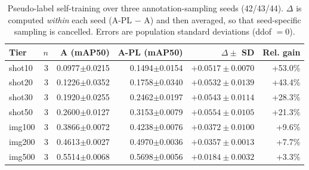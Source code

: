 \begin{table}[htbp]
\centering
\caption{Pseudo-label self-training over three annotation-sampling seeds (42/43/44). $\Delta$ is computed \emph{within} each seed (A-PL $-$ A) and then averaged, so that seed-specific sampling is cancelled. Errors are population standard deviations (ddof $=0$).}
\label{tab:pseudo-label-3seed}
\begin{tabular}{lrrrrr}
\toprule
Tier & $n$ & A (mAP50) & A-PL (mAP50) & $\Delta \pm$ SD & Rel. gain \\
\midrule
shot10 & 3 & 0.0977$\pm$0.0215 & 0.1494$\pm$0.0154 & $+0.0517\pm0.0070$ & +53.0\% \\
shot20 & 3 & 0.1226$\pm$0.0352 & 0.1758$\pm$0.0340 & $+0.0532\pm0.0139$ & +43.4\% \\
shot30 & 3 & 0.1920$\pm$0.0255 & 0.2462$\pm$0.0197 & $+0.0543\pm0.0114$ & +28.3\% \\
shot50 & 3 & 0.2600$\pm$0.0127 & 0.3153$\pm$0.0079 & $+0.0554\pm0.0105$ & +21.3\% \\
img100 & 3 & 0.3866$\pm$0.0072 & 0.4238$\pm$0.0076 & $+0.0372\pm0.0100$ & +9.6\% \\
img200 & 3 & 0.4613$\pm$0.0027 & 0.4970$\pm$0.0036 & $+0.0357\pm0.0013$ & +7.7\% \\
img500 & 3 & 0.5514$\pm$0.0068 & 0.5698$\pm$0.0056 & $+0.0184\pm0.0032$ & +3.3\% \\
\bottomrule
\end{tabular}
\end{table}
